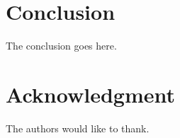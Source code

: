 \section{Conclusion}
The conclusion goes here.

\section*{Acknowledgment}
The authors would like to thank.